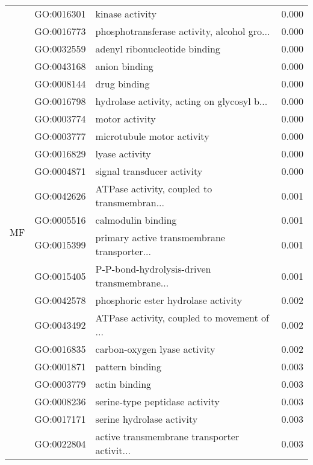 \begin{longtable}{lllr}
\multirow{64}{*}{MF} & GO:0016301 &                              kinase activity &         0.000 \\
   & GO:0016773 &  phosphotransferase activity, alcohol gro... &         0.000 \\
   & GO:0032559 &                adenyl ribonucleotide binding &         0.000 \\
   & GO:0043168 &                                anion binding &         0.000 \\
   & GO:0008144 &                                 drug binding &         0.000 \\
   & GO:0016798 &  hydrolase activity, acting on glycosyl b... &         0.000 \\
   & GO:0003774 &                               motor activity &         0.000 \\
   & GO:0003777 &                   microtubule motor activity &         0.000 \\
   & GO:0016829 &                               lyase activity &         0.000 \\
   & GO:0004871 &                   signal transducer activity &         0.000 \\
   & GO:0042626 &  ATPase activity, coupled to transmembran... &         0.001 \\
   & GO:0005516 &                           calmodulin binding &         0.001 \\
   & GO:0015399 &  primary active transmembrane transporter... &         0.001 \\
   & GO:0015405 &  P-P-bond-hydrolysis-driven transmembrane... &         0.001 \\
   & GO:0042578 &          phosphoric ester hydrolase activity &         0.002 \\
   & GO:0043492 &  ATPase activity, coupled to movement of ... &         0.002 \\
   & GO:0016835 &                 carbon-oxygen lyase activity &         0.002 \\
   & GO:0001871 &                              pattern binding &         0.003 \\
   & GO:0003779 &                                actin binding &         0.003 \\
   & GO:0008236 &               serine-type peptidase activity &         0.003 \\
   & GO:0017171 &                    serine hydrolase activity &         0.003 \\
   & GO:0022804 &  active transmembrane transporter activit... &         0.003 \\

\end{longtable}

